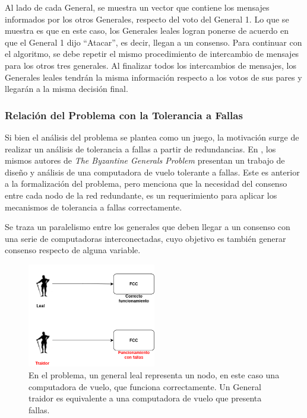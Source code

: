 Al lado de cada General, se muestra un vector que contiene los mensajes informados por los otros Generales, respecto del voto del General 1. Lo que se muestra es que en este caso, los Generales leales logran ponerse de acuerdo en que el General 1 dijo ``Atacar'', es decir, llegan a un consenso. Para continuar con el algoritmo, se debe repetir el mismo procedimiento de intercambio de mensajes para los otros tres generales. Al finalizar todos los intercambios de mensajes, los Generales leales tendrán la misma información respecto a los votos de sus pares y llegarán a la misma decisión final.

\subsubsection{Relación del Problema con la Tolerancia a Fallas}

Si bien el análisis del problema se plantea como un juego, la motivación surge de realizar un análisis de tolerancia a fallas a partir de redundancias. En \cite{wensley1978sift}, los mismos autores de \textit{The Byzantine Generals Problem} presentan un trabajo de diseño y análisis de una computadora de vuelo tolerante a fallas. Este es anterior a la formalización del problema, pero menciona que la necesidad del consenso entre cada nodo de la red redundante, es un requerimiento para aplicar los mecanismos de tolerancia a fallas correctamente.

Se traza un paralelismo entre los generales que deben llegar a un consenso con una serie de computadoras interconectadas, cuyo objetivo es también generar consenso respecto de alguna variable.

\begin{figure}[H]
    \centering
    \includegraphics[width=0.5\textwidth]{img/Byzantine_Generals_Problem_4.png}
    \caption{En el problema, un general leal representa un nodo, en este caso una computadora de vuelo, que funciona correctamente. Un General traidor es equivalente a una computadora de vuelo que presenta fallas.}
    \label{fig:Byzantine_Generals_Problem_4}
\end{figure}

